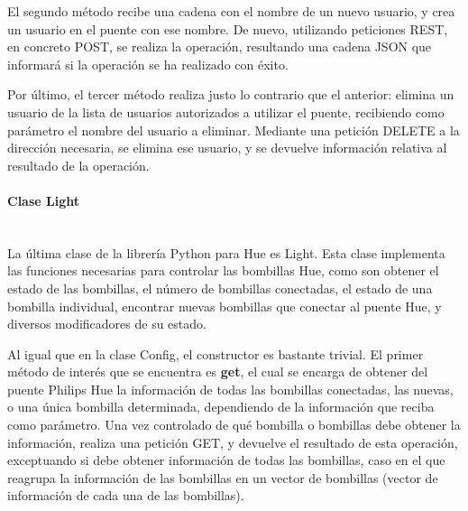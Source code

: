         El segundo método recibe una cadena con el nombre de un nuevo usuario, y crea un usuario en el puente con ese nombre. De nuevo, utilizando peticiones REST, en concreto POST, se realiza la operación, resultando una cadena JSON que informará si la operación se ha realizado con éxito. \\

        \vspace{0.3cm}

        Por último, el tercer método realiza justo lo contrario que el anterior: elimina un usuario de la lista de usuarios autorizados a utilizar el puente, recibiendo como parámetro el nombre del usuario a eliminar. Mediante una petición DELETE a la dirección necesaria, se elimina ese usuario, y se devuelve información relativa al resultado de la operación.

        \paragraph{Clase Light}\mbox{}\\

        La última clase de la librería Python para Hue es Light. Esta clase implementa las funciones necesarias para controlar las bombillas Hue, como son obtener el estado de las bombillas, el número de bombillas conectadas, el estado de una bombilla individual, encontrar nuevas bombillas que conectar al puente Hue, y diversos modificadores de su estado. \\

        \vspace{0.3cm}

        Al igual que en la clase Config, el constructor es bastante trivial. El primer método de interés que se encuentra es \textbf{get}, el cual se encarga de obtener del puente Philips Hue la información de todas las bombillas conectadas, las nuevas, o una única bombilla determinada, dependiendo de la información que reciba como parámetro. Una vez controlado de qué bombilla o bombillas debe obtener la información, realiza una petición GET, y devuelve el resultado de esta operación, exceptuando si debe obtener información de todas las bombillas, caso en el que reagrupa la información de las bombillas en un vector de bombillas (vector de información de cada una de las bombillas). \\

